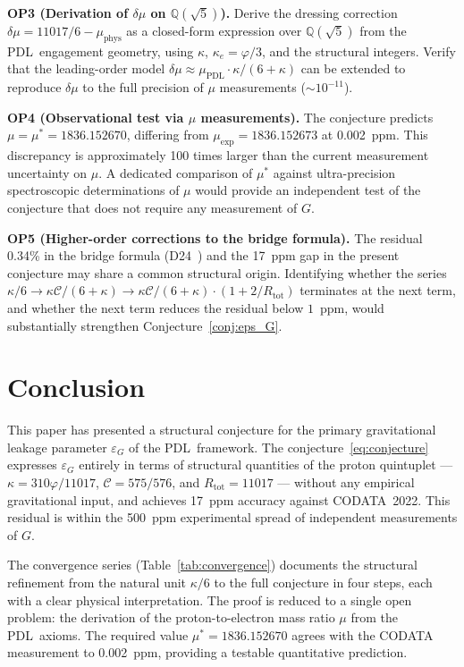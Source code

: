 \documentclass[11pt,a4paper]{article}
\theoremstyle{definition}
\newcommand{\PDL}{\textnormal{PDL}}
\newcommand{\Rtot}{R_{\mathrm{tot}}}
\newcommand{\epsg}{\varepsilon_G}
\newcommand{\calC}{\mathcal{C}}
\newcommand{\vp}{\varphi}
\newcommand{\kap}{\kappa}
\newcommand{\muPDL}{\mu_{\mathrm{PDL}}}
\newcommand{\muexp}{\mu_{\mathrm{exp}}}
\newcommand{\mustar}{\mu^*}
\newcommand{\muphys}{\mu_{\mathrm{phys}}}
\begin{document}
\medskip\noindent\textbf{OP3 (Derivation of $\delta\mu$ on $\mathbb{Q}(\sqrt{5})$).} Derive the dressing correction $\delta\mu = 11017/6 - \muphys$ as a closed-form expression over $\mathbb{Q}(\sqrt{5})$ from the \PDL\ engagement geometry, using $\kap$, $\kap_e = \vp/3$, and the structural integers. Verify that the leading-order model $\delta\mu \approx \muPDL\cdot\kap/(6+\kap)$ can be extended to reproduce $\delta\mu$ to the full precision of $\mu$ measurements ($\sim10^{-11}$).

\medskip\noindent\textbf{OP4 (Observational test via $\mu$ measurements).} The conjecture predicts $\mu = \mustar = 1836.152670$, differing from $\muexp = 1836.152673$ at 0.002~ppm. This discrepancy is approximately 100 times larger than the current measurement uncertainty on $\mu$. A dedicated comparison of $\mustar$ against ultra-precision spectroscopic determinations of $\mu$ would provide an independent test of the conjecture that does not require any measurement of $G$.

\medskip\noindent\textbf{OP5 (Higher-order corrections to the bridge formula).} The residual 0.34\% in the bridge formula (D24~\cite{Bridge_PDL_2026}) and the 17~ppm gap in the present conjecture may share a common structural origin. Identifying whether the series $\kap/6 \to \kap\calC/(6+\kap) \to \kap\calC/(6+\kap)\cdot(1+2/\Rtot)$ terminates at the next term, and whether the next term reduces the residual below $1$~ppm, would substantially strengthen Conjecture~\ref{conj:eps_G}.

\section*{Conclusion}

This paper has presented a structural conjecture for the primary gravitational leakage parameter $\epsg$ of the \PDL\ framework. The conjecture~\eqref{eq:conjecture} expresses $\epsg$ entirely in terms of structural quantities of the proton quintuplet --- $\kap = 310\vp/11017$, $\calC = 575/576$, and $\Rtot = 11017$ --- without any empirical gravitational input, and achieves 17~ppm accuracy against CODATA~2022. This residual is within the 500~ppm experimental spread of independent measurements of $G$.

The convergence series (Table~\ref{tab:convergence}) documents the structural refinement from the natural unit $\kap/6$ to the full conjecture in four steps, each with a clear physical interpretation. The proof is reduced to a single open problem: the derivation of the proton-to-electron mass ratio $\mu$ from the \PDL\ axioms. The required value $\mustar = 1836.152670$ agrees with the CODATA measurement to 0.002~ppm, providing a testable quantitative prediction.
\end{document}
